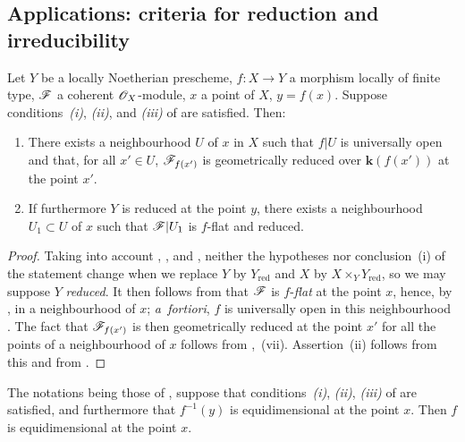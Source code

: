 \subsection{Applications: criteria for reduction and irreducibility}
\label{subsection:IV.15.3}

\begin{proposition}[15.3.1]
\label{IV.15.3.1}
Let $Y$ be a locally Noetherian prescheme, $f:X\to Y$ a morphism locally of finite type, $\mathscr{F}$ a coherent $\mathscr{O}_X$-module, $x$ a point of $X$, $y=f(x)$.
Suppose conditions~\emph{(i)}, \emph{(ii)}, and \emph{(iii)} of  are satisfied.
Then:
\begin{enumerate}[label=\textup{(\roman*)}]
  \item There exists a neighbourhood $U$ of $x$ in $X$ such that $f|U$ is universally open and that, for all $x'\in U$, $\mathscr{F}_{f(x')}$ is geometrically reduced over $\boldsymbol{k}(f(x'))$ at the point $x'$.
  \item If furthermore $Y$ is reduced at the point $y$, there exists a neighbourhood $U_1\subset U$ of $x$ such that $\mathscr{F}|U_1$ is $f$-flat and reduced.
\end{enumerate}
\end{proposition}

\begin{proof}
\label{IV.15.3.1-proof}
Taking into account , , and , neither the hypotheses nor conclusion~(i) of the statement change when we replace $Y$ by $Y_\mathrm{red}$ and $X$ by $X\times_YY_\mathrm{red}$, so we may suppose $Y$ \emph{reduced}.
It then follows from  that $\mathscr{F}$ is $f$-\emph{flat} at the point $x$, hence, by , in a neighbourhood of $x$; \emph{a~fortiori}, $f$ is universally open in this neighbourhood .
The fact that $\mathscr{F}_{f(x')}$ is then geometrically reduced at the point $x'$
for all the points of a neighbourhood of $x$ follows from ,~(vii).
Assertion~(ii) follows from this and from .
\end{proof}

\begin{proposition}[15.3.2]
\label{IV.15.3.2}
The notations being those of , suppose that conditions~\emph{(i)}, \emph{(ii)}, \emph{(iii)} of  are satisfied, and furthermore that $f^{-1}(y)$ is equidimensional at the point $x$.
Then $f$ is equidimensional at the point $x$.
\end{proposition}


